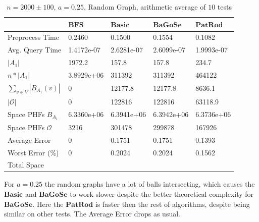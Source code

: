 \documentclass[shortabstract, lic, english]{iithesis}
\theoremstyle{definition} \newtheorem{definition}{Definition}[chapter]
\theoremstyle{remark} \newtheorem{remark}[definition]{Observation}
\theoremstyle{plain} \newtheorem{theorem}[definition]{Theorem}
\theoremstyle{plain} \newtheorem{lemma}[definition]{Lemma}
\theoremstyle{plain} \newtheorem{conjecture}[definition]{Conjecture}
\begin{document}
\begin{table}[H] \label{test:random.a0.25}
    \centering
    \begin{tabular}{ |p{3cm}||p{2cm}|p{2cm}|p{2cm}|p{2cm}|  } 
        \hline
        & $\mathbf{BFS}$ & $\mathbf{Basic}$ & $\mathbf{BaGoSe}$ & $\mathbf{PatRod}$ \\
        \hline
        \hline
        Preprocess Time                 & 0.2460     & 0.1500     & 0.1554      & 0.1082     \\
        \hline
        Avg. Query Time                 & 1.4172e-07 & 2.6281e-07 & 2.6099e-07  & 1.9993e-07 \\
        \hline
        $|A_1|$                         & 1972.2     & 157.8      & 157.8       & 234.7      \\
        \hline
        $n * |A_1|$                     & 3.8929e+06 & 311392     & 311392      & 464122     \\
        \hline
        $\sum_{v \in V} |B_{A_1}(v)| $  & 0          & 12177.8    & 12177.8     & 8636.1     \\
        \hline
        $|\mathcal{O}|$                 & 0          & 122816     & 122816      & 63118.9    \\
        \hline
        Space PHFs $B_{A_1}$            & 6.3360e+06 & 6.3941e+06 & 6.3942e+06  & 6.3736e+06 \\
        \hline
        Space PHFs $\mathcal{O}$        & 3216       & 301478     & 299878      & 167926     \\
        \hline
        Average Error                   & 0          & 0.1751     & 0.1751      & 0.1393     \\
        \hline
        Worst Error (\%)                & 0          & 0.2024     & 0.2024      & 0.1562     \\
        \hline
        Total Space                     &            &            &             &            \\
        \hline

    \end{tabular}
    \caption{$n = 2000 \pm 100$, $a = 0.25$, Random Graph, arithmetic average of $10$ tests}
\end{table}

For $a = 0.25$ the random graphs have a lot of balls intersecting, which causes the $\mathbf{Basic}$ and $\mathbf{BaGoSe}$
to work slower despite the better theoretical complexity for $\mathbf{BaGoSe}$.
Here the $\mathbf{PatRod}$ is faster then the rest of algorithms, despite being similar on other tests.
The Average Error drops as usual.
\end{document}
